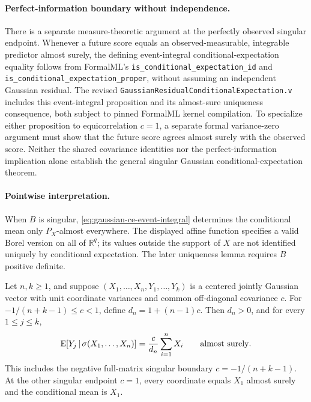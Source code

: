 \paragraph{Perfect-information boundary without independence.}
There is a separate measure-theoretic argument at the perfectly
observed singular endpoint. Whenever a future score equals an
observed-measurable, integrable predictor almost surely, the defining
event-integral conditional-expectation equality follows from
FormalML's \nolinkurl{is_conditional_expectation_id} and
\nolinkurl{is_conditional_expectation_proper}, without assuming an
independent Gaussian residual. The revised
\nolinkurl{GaussianResidualConditionalExpectation.v} includes this
event-integral proposition and its almost-sure uniqueness consequence,
both subject to pinned FormalML kernel compilation. To specialize
either proposition to equicorrelation \(c=1\), a separate formal
variance-zero argument must show that the future score agrees almost
surely with the observed score. Neither the shared covariance
identities nor the perfect-information implication alone establish the
general singular Gaussian conditional-expectation theorem.

\paragraph{Pointwise interpretation.}
When \(B\) is singular, \eqref{eq:gaussian-ce-event-integral}
determines the conditional mean only \(P_X\)-almost everywhere.
The displayed affine function specifies a valid Borel version on all
of \(\mathbb R^q\); its values outside the support of \(X\) are not
identified uniquely by conditional expectation. The later uniqueness
lemma requires \(B\) positive definite.


\begin{corollary}
\label{cor:gaussian-ce-signed-equicorrelation}
Let \(n,k\geq1\), and suppose
\((X_1,\ldots,X_n,Y_1,\ldots,Y_k)\) is a centered jointly
Gaussian vector with unit coordinate variances and common
off-diagonal covariance \(c\). For
\(-1/(n+k-1)\leq c<1\), define \(d_n=1+(n-1)c\). Then
\(d_n>0\), and for every \(1\leq j\leq k\),
\[
  \operatorname{E}[Y_j\,\vert\,\sigma(X_1,\ldots,X_n)]
  =\frac{c}{d_n}\sum_{i=1}^n X_i
  \qquad\text{almost surely}.
\]
This includes the negative full-matrix singular boundary
\(c=-1/(n+k-1)\). At the other singular endpoint \(c=1\),
every coordinate equals \(X_1\) almost surely and the conditional
mean is \(X_1\).
\end{corollary}

